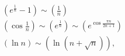 \begin{eqnarray*}
(e^{\frac{1}{n}}-1)\sim (\frac{1}{n})\\
(\cos \frac{1}{n}) \sim (e^{\frac{1}{n}}) \sim (e^{\cos \frac{\pi n}{2n+1}})\\
(\ln n) \sim (\ln (n+\sqrt n)), 
\end{eqnarray*}
